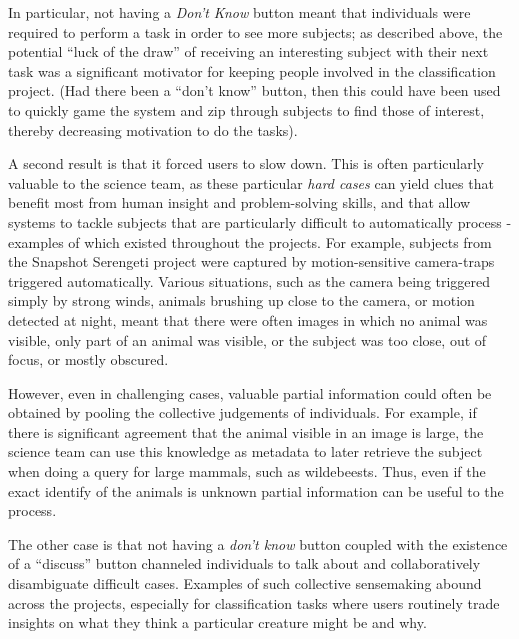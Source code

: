 \documentclass{sigchi}
\begin{document}
In particular, not having a \emph{Don't Know} button meant that individuals were required to perform a task in order to see more subjects; as described above, the  potential ``luck of the draw'' of receiving an interesting subject with their next task was a significant motivator for keeping people involved in the classification project.   (Had there been a ``don't know'' button, then this could have been used to quickly game the system and zip through subjects to find those of interest, thereby decreasing motivation to do the tasks).

A second result is that it forced users to slow down.  This is often  particularly valuable to the science team, as these particular \emph{hard cases} can yield clues that benefit most from human insight and problem-solving skills, and that allow systems to tackle subjects that are particularly difficult to automatically process - examples of which existed throughout the projects.  For example, subjects from the Snapshot Serengeti project were captured by motion-sensitive camera-traps triggered automatically.  Various situations, such as the camera being triggered simply by strong winds, animals brushing up close to the camera, or motion detected at night, meant that there were often images in which no animal was visible, only part of an animal was visible, or the subject was too close, out of focus, or mostly obscured. 

However, even in challenging cases, valuable partial information could often be obtained by pooling the collective judgements of individuals.  For example, if there is significant agreement that the animal visible in an image is large, the science team can use this knowledge as metadata to later retrieve the subject when doing a query for large mammals, such as wildebeests. Thus, even if the exact identify of the animals is unknown partial information can be useful to the process.  %


The other case is that not having a \emph{don't know} button coupled with the existence of a ``discuss'' button channeled individuals to talk about and collaboratively disambiguate difficult cases.  Examples of such collective sensemaking abound across the projects, especially for classification tasks where users routinely trade insights on what they think a particular creature might be and why.  
\end{document}
